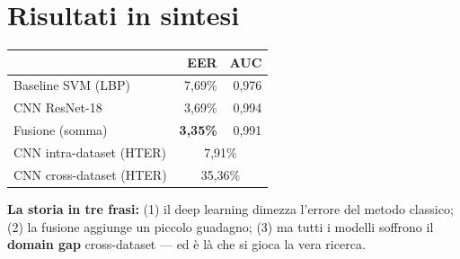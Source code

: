 \documentclass[11pt,a4paper]{article}
\begin{document}
\section{Risultati in sintesi}
\begin{center}
\begin{tabular}{@{}lrr@{}}
\toprule
& \textbf{EER} & \textbf{AUC} \\
\midrule
Baseline SVM (LBP)       & 7,69\% & 0,976 \\
CNN ResNet-18            & 3,69\% & 0,994 \\
Fusione (somma)          & \textbf{3,35\%} & 0,991 \\
\midrule
CNN intra-dataset (HTER) & \multicolumn{2}{c}{7,91\%} \\
CNN cross-dataset (HTER) & \multicolumn{2}{c}{35,36\%} \\
\bottomrule
\end{tabular}
\end{center}

\noindent\textbf{La storia in tre frasi:} (1) il deep learning dimezza l'errore del metodo
classico; (2) la fusione aggiunge un piccolo guadagno; (3) ma tutti i modelli soffrono il
\textbf{domain gap} cross-dataset --- ed \`e l\`a che si gioca la vera ricerca.

\end{document}

